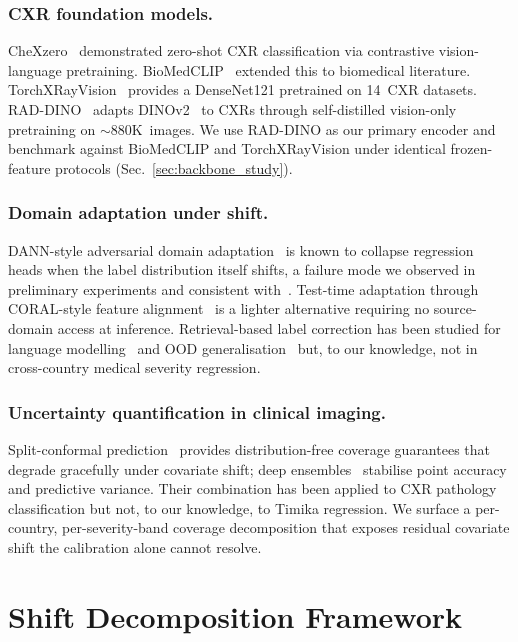 \documentclass[runningheads]{llncs}
\begin{document}
\subsubsection{CXR foundation models.}
CheXzero~\cite{tiu2022chexzero} demonstrated zero-shot CXR classification via contrastive vision-language pretraining. BioMedCLIP~\cite{zhang2024biomedclip} extended this to biomedical literature. TorchXRayVision~\cite{cohen2022torchxrayvision} provides a DenseNet121 pretrained on 14~CXR datasets. RAD-DINO~\cite{perez2024raddino} adapts DINOv2~\cite{oquab2024dinov2} to CXRs through self-distilled vision-only pretraining on $\sim 880$K~images. We use RAD-DINO as our primary encoder and benchmark against BioMedCLIP and TorchXRayVision under identical frozen-feature protocols (Sec.~\ref{sec:backbone_study}).

\subsubsection{Domain adaptation under shift.}
DANN-style adversarial domain adaptation~\cite{ganin2016domain} is known to collapse regression heads when the label distribution itself shifts, a failure mode we observed in preliminary experiments and consistent with~\cite{gulrajani2021domainbed}. Test-time adaptation through CORAL-style feature alignment~\cite{sun2016deepcoral} is a lighter alternative requiring no source-domain access at inference. Retrieval-based label correction has been studied for language modelling~\cite{khandelwal2020knnlm} and OOD generalisation~\cite{long2022retievalood} but, to our knowledge, not in cross-country medical severity regression.

\subsubsection{Uncertainty quantification in clinical imaging.}
Split-conformal prediction~\cite{angelopoulos2023conformalintro} provides distribution-free coverage guarantees that degrade gracefully under covariate shift; deep ensembles~\cite{lakshminarayanan2017deepensembles} stabilise point accuracy and predictive variance. Their combination has been applied to CXR pathology classification but not, to our knowledge, to Timika regression. We surface a per-country, per-severity-band coverage decomposition that exposes residual covariate shift the calibration alone cannot resolve.

\section{Shift Decomposition Framework}
\label{sec:framework}
\end{document}

